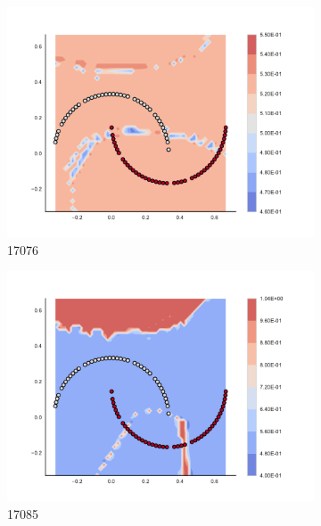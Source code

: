         \begin{figure}[h]\ContinuedFloat
        
\begin{subfigure}[b]{0.09\textwidth}
    \includegraphics[clip, trim=2.35cm 1.75cm 4.5cm 0cm,width=\textwidth]{img/convergence/17076.pdf}
    \caption{17076}
    \label{fig:convergence_17076}
\end{subfigure}
%
\begin{subfigure}[b]{0.09\textwidth}
    \includegraphics[clip, trim=2.35cm 1.75cm 4.5cm 0cm,width=\textwidth]{img/convergence/17085.pdf}
    \caption{17085}
    \label{fig:convergence_17085}
\end{subfigure}
%
\begin{subfigure}[b]{0.09\textwidth}

\end{subfigure}
\end{figure}
